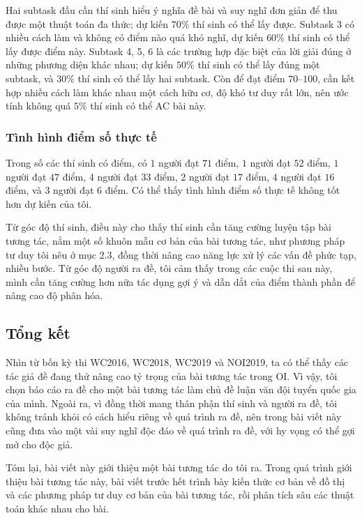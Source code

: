 \documentclass[11pt]{article}
\begin{document}
Hai subtask đầu cần thí sinh hiểu ý nghĩa đề bài và suy nghĩ đơn giản để thu
được một thuật toán đa thức; dự kiến \(70\%\) thí sinh có thể lấy được. Subtask
3 có nhiều cách làm và không có điểm nào quá khó nghĩ, dự kiến \(60\%\) thí
sinh có thể lấy được điểm này. Subtask 4, 5, 6 là các trường hợp đặc biệt của
lời giải đúng ở những phương diện khác nhau; dự kiến \(50\%\) thí sinh có thể
lấy đúng một subtask, và \(30\%\) thí sinh có thể lấy hai subtask. Còn để đạt
điểm \(70\)--\(100\), cần kết hợp nhiều cách làm khác nhau một cách hữu cơ, độ
khó tư duy rất lớn, nên ước tính không quá \(5\%\) thí sinh có thể AC bài này.

\subsubsection{Tình hình điểm số thực tế}

Trong số các thí sinh có điểm, có \(1\) người đạt \(71\) điểm, \(1\) người đạt
\(52\) điểm, \(1\) người đạt \(47\) điểm, \(4\) người đạt \(33\) điểm, \(2\)
người đạt \(17\) điểm, \(4\) người đạt \(16\) điểm, và \(3\) người đạt \(6\)
điểm. Có thể thấy tình hình điểm số thực tế không tốt hơn dự kiến của tôi.

Từ góc độ thí sinh, điều này cho thấy thí sinh cần tăng cường luyện tập bài
tương tác, nắm một số khuôn mẫu cơ bản của bài tương tác, như phương pháp tư
duy tôi nêu ở mục 2.3, đồng thời nâng cao năng lực xử lý các vấn đề phức tạp,
nhiều bước. Từ góc độ người ra đề, tôi cảm thấy trong các cuộc thi sau này,
mình cần tăng cường hơn nữa tác dụng gợi ý và dẫn dắt của điểm thành phần để
nâng cao độ phân hóa.

\subsection{Tổng kết}

Nhìn từ bốn kỳ thi WC2016, WC2018, WC2019 và NOI2019, ta có thể thấy các tác
giả đề đang thử nâng cao tỷ trọng của bài tương tác trong OI. Vì vậy, tôi chọn
báo cáo ra đề cho một bài tương tác làm chủ đề luận văn đội tuyển quốc gia của
mình. Ngoài ra, vì đồng thời mang thân phận thí sinh và người ra đề, tôi không
tránh khỏi có cách hiểu riêng về quá trình ra đề, nên trong bài viết này cũng
đưa vào một vài suy nghĩ độc đáo về quá trình ra đề, với hy vọng có thể gợi mở
cho độc giả.

Tóm lại, bài viết này giới thiệu một bài tương tác do tôi ra. Trong quá trình
giới thiệu bài tương tác này, bài viết trước hết trình bày kiến thức cơ bản về
đồ thị và các phương pháp tư duy cơ bản của bài tương tác, rồi phân tích sâu
các thuật toán khác nhau cho bài.
\end{document}
